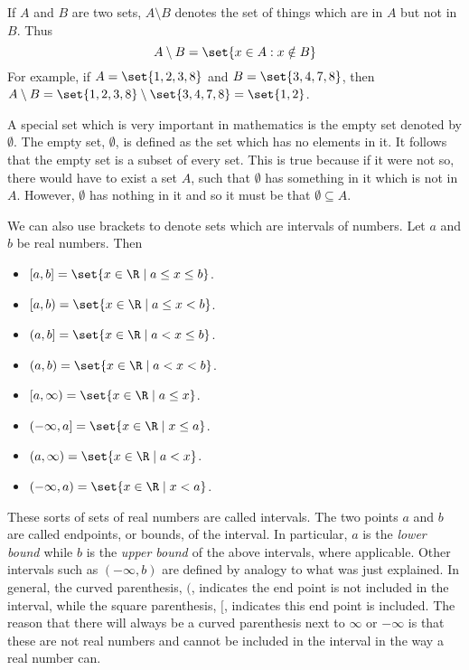 If $A$ and $B$ are two sets, $A\setminus B$\index{$\setminus$} denotes the set of things which
are in $A$ but not in $B$. Thus
\begin{equation*}
A\setminus B =  \set{x\in A:x\notin B} 
\end{equation*}
For example, if $A = \set{1,2,3,8 }$ and $B = \set{3,4,7,8 }$, then $A \setminus B = \set{1,2,3,8} \setminus 
\set{3,4,7,8 } =\set{1,2 }$.

A special set which is very important in mathematics is the empty set denoted by $\emptyset$. The empty set, $\emptyset$, is
defined as the set which has no elements in it. It follows that the empty set is a subset of every set. 
This is true because if it were not so, there would have to exist a set $A$, such that $\emptyset $
has something in it which is not in $A$. However, $\emptyset $ has nothing
in it and so it must be that $\emptyset \subseteq A$.

We can also use brackets to denote sets which are intervals of numbers. Let $a$ and $b$ be real numbers. Then

\begin{itemize}
\item $[a,b] = \set{x \in \R \mid a\leq x\leq b}$.
\item $[a,b) = \set{x \in \R \mid a\leq x<b}$.
\item $(a,b] = \set{x \in \R \mid a<x\leq b}$.
\item $(a,b) = \set{x \in \R \mid a<x<b}$.
\item $[a,\infty) = \set{x \in \R \mid a\leq x}$.
\item $(-\infty,a] = \set{x \in \R \mid x\leq a}$.
\item $(a,\infty) = \set{x \in \R \mid a<x}$.
\item $(-\infty,a) = \set{x \in \R \mid x<a}$.
\end{itemize}

These sorts of sets of real
numbers are called intervals. The two points $a$ and $b$ are called
endpoints, or bounds, of the interval. In particular, $a$ is the {\em lower bound \em}  while $b$ is the {\em upper bound \em} of the above
intervals, where applicable. Other intervals such as $(-\infty ,b) $
are defined by analogy to what was just explained.
 In general, the curved
parenthesis, $($, indicates the end point is not included in the interval, while
the square parenthesis, $[$, indicates this end point is included. The reason that
there will always be a curved parenthesis next to $\infty $ or $-\infty $ is
that these are not real numbers and cannot be included in the interval in the way a real number can. 

